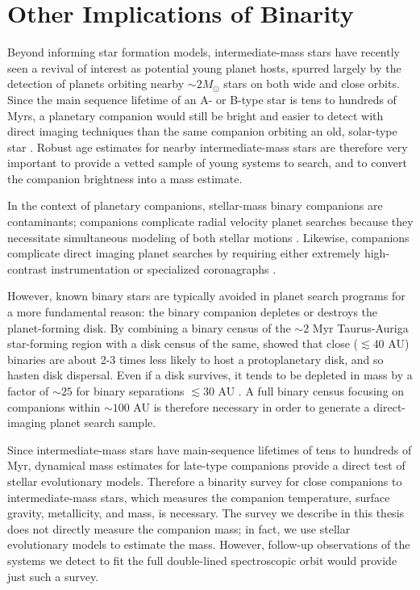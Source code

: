 \documentclass{utthesis}
\begin{document}
\section{Other Implications of Binarity}

Beyond informing star formation models, intermediate-mass stars have recently seen a revival of interest as potential young planet hosts, spurred largely by the detection of planets orbiting nearby \mbox{$\sim2 M_{\odot}$} stars on both wide \citep[e.g.][]{Lagrange2010, Marois2008} and close \citep{Johnson2011} orbits. Since the main sequence lifetime of an A- or B-type star is tens to hundreds of Myrs, a planetary companion would still be bright and easier to detect with direct imaging techniques than the same companion orbiting an old, solar-type star \citep{Marley2007}. Robust age estimates for nearby intermediate-mass stars are therefore very important to provide a vetted sample of young systems to search, and to convert the companion brightness into a mass estimate. 

In the context of planetary companions, stellar-mass binary companions are contaminants; companions complicate radial velocity planet searches because they necessitate simultaneous modeling of both stellar motions \citep[e.g.][]{Bergmann2015}. Likewise, companions complicate direct imaging planet searches by requiring either extremely high-contrast instrumentation \citep{Thalmann2014} or specialized coronagraphs \citep{Crepp2010}. 

However, known binary stars are typically avoided in planet search programs for a more fundamental reason: the binary companion depletes or destroys the planet-forming disk. By combining a binary census of the $\sim 2$ Myr Taurus-Auriga star-forming region with a disk census of the same, \cite{Kraus2012} showed that close ($\lesssim 40$ AU) binaries are about 2-3 times less likely to host a protoplanetary disk, and so hasten disk dispersal. Even if a disk survives, it tends to be depleted in mass by a factor of $\sim 25$ for binary separations $\lesssim 30$ AU \citep{Harris2012}. A full binary census focusing on companions within $\sim 100$ AU is therefore necessary in order to generate a direct-imaging planet search sample.

Since intermediate-mass stars have main-sequence lifetimes of tens to hundreds of Myr, dynamical mass estimates for late-type companions provide a direct test of stellar evolutionary models. Therefore a binarity survey for close companions to intermediate-mass stars, which measures the companion temperature, surface gravity, metallicity, and mass, is necessary. The survey we describe in this thesis does not directly measure the companion mass; in fact, we use stellar evolutionary models to estimate the mass. However, follow-up observations of the systems we detect to fit the full double-lined spectroscopic orbit would provide just such a survey.
\end{document}
